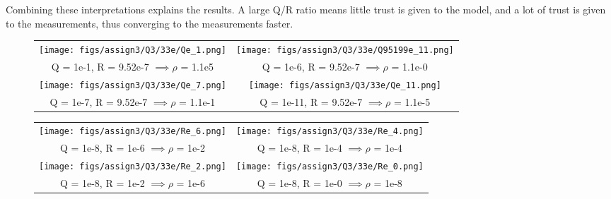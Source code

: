 \documentclass[a4paper]{article}
\newcommand{\newpar}{\vspace{.3cm}\noindent}
\begin{document}
\newpar
Combining these interpretations explains the results. A large Q/R ratio means little trust is given to the model, and a lot of trust is given to the measurements, thus converging to the measurements faster. 

\begin{figure}[H]
\begin{adjustwidth}{-3cm}{-3cm}
\centering
\begin{tabular}{cc}
  \texttt{[image: figs/assign3/Q3/33e/Qe\_1.png]} & \texttt{[image: figs/assign3/Q3/33e/Q95199e\_11.png]} \\
  Q = 1e-1, R = 9.52e-7 $\implies \rho$ = 1.1e5 & Q = 1e-6, R = 9.52e-7 $\implies \rho$ = 1.1e-0\\[8pt]
  \texttt{[image: figs/assign3/Q3/33e/Qe\_7.png]} & \texttt{[image: figs/assign3/Q3/33e/Qe\_11.png]} \\
  Q = 1e-7, R = 9.52e-7 $\implies \rho$ = 1.1e-1 & Q = 1e-11, R = 9.52e-7 $\implies \rho$ = 1.1e-5
\end{tabular}
\end{adjustwidth}
\label{fig:QcteR_state_respons}
\end{figure}


\begin{figure}[H]
\begin{adjustwidth}{-3cm}{-3cm}
\centering
\begin{tabular}{cc}
  \texttt{[image: figs/assign3/Q3/33e/Re\_6.png]} & \texttt{[image: figs/assign3/Q3/33e/Re\_4.png]}\\
  Q = 1e-8, R = 1e-6 $\implies \rho$ = 1e-2 & Q = 1e-8, R = 1e-4 $\implies \rho$ = 1e-4\\[8pt]
  \texttt{[image: figs/assign3/Q3/33e/Re\_2.png]} & \texttt{[image: figs/assign3/Q3/33e/Re\_0.png]}\\
  Q = 1e-8, R = 1e-2 $\implies \rho$ = 1e-6 & Q = 1e-8, R = 1e-0 $\implies \rho$ = 1e-8\\[8pt]
\end{tabular}
\end{adjustwidth}
\label{fig:cteQR_state_respons}
\end{figure}
\end{document}
